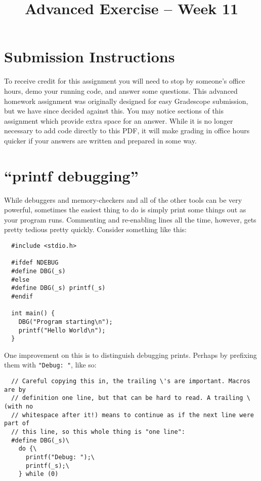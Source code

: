 \documentclass{article}
\begin{document}
\fancyfoot[C]{\color{gray} \thepage~/~\pageref*{LastPage}}
\pagestyle{fancyplain}


\title{\textbf{Advanced Exercise -- Week 11\\}}
\author{\textbf{\color{red}{Due: Before March 31, 10:00PM}}}
\date{}
\maketitle


\section*{Submission Instructions}
To receive credit for this assignment you will need to stop by someone's office
hours, demo your running code, and answer some questions. This advanced
homework assignment was originally designed for easy Gradescope submission, but
we have since decided against this. You may notice sections of this assignment
which provide extra space for an answer. While it is no longer necessary to add
code directly to this PDF, it will make grading in office hours quicker if your
answers are written and prepared in some way.

\newpage


\section{``printf debugging''}

While debuggers and memory-checkers and all of the other tools can be very
powerful, sometimes the easiest thing to do is simply print some things out as
your program runs. Commenting and re-enabling lines all the time, however,
gets pretty tedious pretty quickly. Consider something like this:

\begin{lstlisting}
  #include <stdio.h>

  #ifdef NDEBUG
  #define DBG(_s)
  #else
  #define DBG(_s) printf(_s)
  #endif

  int main() {
    DBG("Program starting\n");
    printf("Hello World\n");
  }
\end{lstlisting}

One improvement on this is to distinguish debugging prints. Perhaps by
prefixing them with \texttt{"Debug: "}, like so:

\begin{lstlisting}
  // Careful copying this in, the trailing \'s are important. Macros are by
  // definition one line, but that can be hard to read. A trailing \ (with no
  // whitespace after it!) means to continue as if the next line were part of
  // this line, so this whole thing is "one line":
  #define DBG(_s)\
    do {\
      printf("Debug: ");\
      printf(_s);\
    } while (0)
\end{lstlisting}
\end{document}
